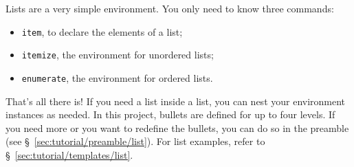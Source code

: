 \noindent Lists are a very simple \gls{environment}. You only need to know three \glspl{command}:
\begin{itemize}
    \item \texttt{item}, to declare the elements of a list;
    \item \texttt{itemize}, the \gls{environment} for unordered lists;
    \item \texttt{enumerate}, the \gls{environment} for ordered lists.
\end{itemize}

That's all there is! If you need a list inside a list, you can nest your \gls{environment} instances as needed. In this project, bullets are defined for up to four levels. If you need more or you want to redefine the bullets, you can do so in the preamble (see \S~\ref{sec:tutorial/preamble/list}). For list examples, refer to \S~\ref{sec:tutorial/templates/list}.